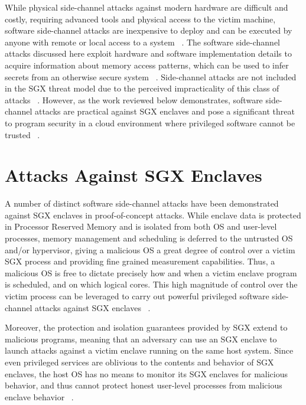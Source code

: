 While physical side-channel attacks against modern hardware are difficult and costly, requiring advanced tools and physical access to the victim machine, software side-channel attacks are inexpensive to deploy and can be executed by anyone with remote or local access to a system ~\cite{costan_intel_2016}. The software side-channel attacks discussed here exploit hardware and software implementation details to acquire information about memory access patterns, which can be used to infer secrets from an otherwise secure system ~\cite{gotzfried_cache_2017, schwarz_malware_2017, xu_controlled-channel_2015, shinde_preventing_2015}. Side-channel attacks are not included in the SGX threat model due to the perceived impracticality of this class of attacks ~\cite{intel_corporation_intel_2016, costan_intel_2016}. However, as the work reviewed below demonstrates, software side-channel attacks are practical against SGX enclaves and pose a significant threat to program security in a cloud environment where privileged software cannot be trusted ~\cite{moghimi_cachezoom:_2017, intel_corporation_tutorial_2015}.

\section{Attacks Against SGX Enclaves}

A number of distinct software side-channel attacks have been demonstrated against SGX enclaves in proof-of-concept attacks. While enclave data is protected in Processor Reserved Memory and is isolated from both OS and user-level processes, memory management and scheduling is deferred to the untrusted OS and/or hypervisor, giving a malicious OS a great degree of control over a victim SGX process and providing fine grained measurement capabilities. Thus, a malicious OS is free to dictate precisely how and when a victim enclave program is scheduled, and on which logical cores. This high magnitude of control over the victim process can be leveraged to carry out powerful privileged software side-channel attacks against SGX enclaves ~\cite{costan_intel_2016}. 

Moreover, the protection and isolation guarantees provided by SGX extend to malicious programs, meaning that an adversary can use an SGX enclave to launch attacks against a victim enclave running on the same host system. Since even privileged services are oblivious to the contents and behavior of SGX enclaves, the host OS has no means to monitor its SGX enclaves for malicious behavior, and thus cannot protect honest user-level processes from malicious enclave behavior ~\cite{costan_intel_2016, schwarz_malware_2017}.

